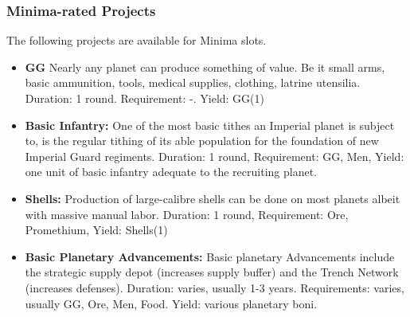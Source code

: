 \subsubsection{Minima-rated Projects} 
The following projects are available for Minima slots. 
\begin{itemize} 
    \item \textbf{GG} Nearly any planet can produce something of value. Be it small arms, basic ammunition, tools, medical supplies, clothing, latrine utensilia. Duration: 1 round. Requirement: -. Yield: GG(1)  
    \item \textbf{Basic Infantry:} One of the most basic tithes an Imperial planet is subject to, is the regular tithing of its able population for the foundation of new Imperial Guard regiments. Duration: 1 round, Requirement: GG, Men, Yield: one unit of basic infantry adequate to the recruiting planet. 
    \item \textbf{Shells:} Production of large-calibre shells can be  done on most planets albeit with massive manual labor. Duration: 1 round, Requirement: Ore, Promethium, Yield: Shells(1) 
    \item \textbf{Basic Planetary Advancements:} Basic planetary Advancements include the strategic supply depot (increases supply buffer) and the Trench Network (increases defenses). Duration: varies, usually 1-3 years. Requirements: varies, usually GG, Ore, Men, Food. Yield: various planetary boni.
\end{itemize} 

